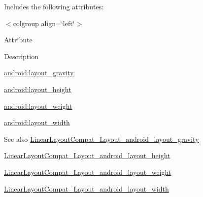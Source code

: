 Includes the following attributes\+:

\begin{TabularC}{0}
\hline
\end{TabularC}
$<$colgroup align=\char`\"{}left\char`\"{}$>$ 

Attribute

Description 

{\ttfamily \hyperlink{classcheck_1_1test_1_1_r_1_1styleable_aa48e9aa39976dff71ce334a57bdf2be0}{android\+:layout\+\_\+gravity}}

{\ttfamily \hyperlink{classcheck_1_1test_1_1_r_1_1styleable_a806ac33c9f85fe7dd05e4f470f07c354}{android\+:layout\+\_\+height}}

{\ttfamily \hyperlink{classcheck_1_1test_1_1_r_1_1styleable_a299ea2d69f5676bd2a0f96a6d99a9be2}{android\+:layout\+\_\+weight}}

{\ttfamily \hyperlink{classcheck_1_1test_1_1_r_1_1styleable_a66569db7d0c170d5da67560afcc12a87}{android\+:layout\+\_\+width}}

\begin{DoxySeeAlso}{See also}
\hyperlink{classcheck_1_1test_1_1_r_1_1styleable_aa48e9aa39976dff71ce334a57bdf2be0}{Linear\+Layout\+Compat\+\_\+\+Layout\+\_\+android\+\_\+layout\+\_\+gravity} 

\hyperlink{classcheck_1_1test_1_1_r_1_1styleable_a806ac33c9f85fe7dd05e4f470f07c354}{Linear\+Layout\+Compat\+\_\+\+Layout\+\_\+android\+\_\+layout\+\_\+height} 

\hyperlink{classcheck_1_1test_1_1_r_1_1styleable_a299ea2d69f5676bd2a0f96a6d99a9be2}{Linear\+Layout\+Compat\+\_\+\+Layout\+\_\+android\+\_\+layout\+\_\+weight} 

\hyperlink{classcheck_1_1test_1_1_r_1_1styleable_a66569db7d0c170d5da67560afcc12a87}{Linear\+Layout\+Compat\+\_\+\+Layout\+\_\+android\+\_\+layout\+\_\+width} 
\end{DoxySeeAlso}
\hypertarget{classcheck_1_1test_1_1_r_1_1styleable_aa48e9aa39976dff71ce334a57bdf2be0}{}
